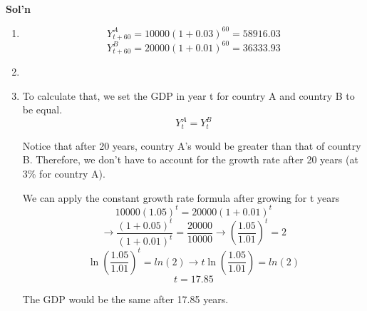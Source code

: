 \documentclass[14pt, oneside]{memoir}
\begin{document}
\begin{enumerate}[label=\textbf{\arabic*.}, itemsep=15pt]
\begin{enumerate}[label=(\alph*)]
	
	
	
%	
	
	
\end{enumerate}

\textbf{Sol'n}
\begin{enumerate}[label=(\alph*)]
	\item
	\[Y^A_{t+60} = 10000(1+0.03)^{60} = 58916.03\]
	\[Y^B_{t+60} = 20000(1+0.01)^{60} = 36333.93\]

	\item \item[] To calculate that, we set the GDP in year t for country A and country B to be equal.
	\[Y^A_t =Y^B_t\]
	
	Notice that after 20 years, country A's would be greater than that of country B. Therefore, we don't have to account for the growth rate after 20 years (at 3\% for country A).
	
	\clearpage
	We can apply the constant growth rate formula after growing  for t years
	\[10000 (1.05)^{t}  = 20000 (1+0.01)^t \]
	\[\to  \frac{(1+0.05)^t }{(1+0.01)^t }= \frac{20000 }{10000}  \to \left(\frac{1.05}{1.01}\right)^t = 2\]
	\[\ln\left(\frac{1.05}{1.01}\right)^t = ln(2) \to t\ln\left(\frac{1.05}{1.01}\right) = ln\left(2\right)\]
	\[t= 17.85\]
	
	The GDP would be the same after 17.85 years.
	


\end{enumerate}
\end{enumerate}
\end{document}
